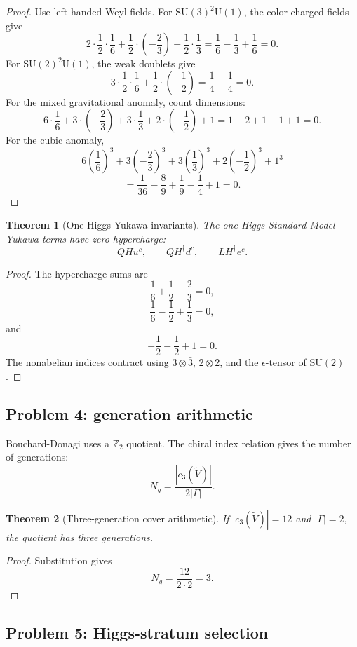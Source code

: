 \documentclass[11pt]{article}
\newtheorem{theorem}{Theorem}[section]
\theoremstyle{remark}
\theoremstyle{plain}
\newcommand{\SU}{\mathrm{SU}}
\newcommand{\U}{\mathrm{U}}
\newcommand{\Z}{\mathbb Z}
\begin{document}
\begin{proof}
Use left-handed Weyl fields. For \(\SU(3)^2\U(1)\), the color-charged fields give
\[
2\cdot\frac12\cdot\frac16
+\frac12\cdot\left(-\frac23\right)
+\frac12\cdot\frac13
=
\frac16-\frac13+\frac16=0.
\]
For \(\SU(2)^2\U(1)\), the weak doublets give
\[
3\cdot\frac12\cdot\frac16
+\frac12\cdot\left(-\frac12\right)
=\frac14-\frac14=0.
\]
For the mixed gravitational anomaly, count dimensions:
\[
6\cdot\frac16
+3\cdot\left(-\frac23\right)
+3\cdot\frac13
+2\cdot\left(-\frac12\right)
+1
=1-2+1-1+1=0.
\]
For the cubic anomaly,
\[
6\left(\frac16\right)^3
+3\left(-\frac23\right)^3
+3\left(\frac13\right)^3
+2\left(-\frac12\right)^3
+1^3
\]
\[
=\frac1{36}-\frac89+\frac19-\frac14+1
=0.
\]
\end{proof}

\begin{theorem}[One-Higgs Yukawa invariants]
The one-Higgs Standard Model Yukawa terms have zero hypercharge:
\[
QHu^c,\qquad QH^\dagger d^c,\qquad LH^\dagger e^c.
\]
\end{theorem}

\begin{proof}
The hypercharge sums are
\[
\frac16+\frac12-\frac23=0,
\]
\[
\frac16-\frac12+\frac13=0,
\]
and
\[
-\frac12-\frac12+1=0.
\]
The nonabelian indices contract using \(3\otimes\bar3\), \(2\otimes2\), and the
\(\epsilon\)-tensor of \(\SU(2)\).
\end{proof}

\subsection{Problem 4: generation arithmetic}

Bouchard-Donagi uses a \(\Z_2\) quotient. The chiral index relation gives the number of
generations:
\[
N_g=\frac{|c_3(\widetilde V)|}{2|\Gamma|}.
\]

\begin{theorem}[Three-generation cover arithmetic]
If \(|c_3(\widetilde V)|=12\) and \(|\Gamma|=2\), the quotient has three generations.
\end{theorem}

\begin{proof}
Substitution gives
\[
N_g=\frac{12}{2\cdot2}=3.
\]
\end{proof}

\subsection{Problem 5: Higgs-stratum selection}
\end{document}
